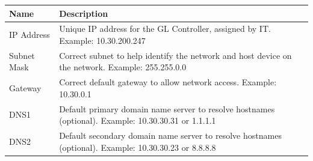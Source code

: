 \begin{longtable}[]{@{}ll@{}}
\toprule
\begin{minipage}[b]{0.26\columnwidth}\raggedright
Name\strut
\end{minipage} & \begin{minipage}[b]{0.68\columnwidth}\raggedright
Description\strut
\end{minipage}\tabularnewline
\midrule
\endhead
\begin{minipage}[t]{0.26\columnwidth}\raggedright
IP Address\strut
\end{minipage} & \begin{minipage}[t]{0.68\columnwidth}\raggedright
Unique IP address for the GL Controller, assigned by IT. Example:
10.30.200.247\strut
\end{minipage}\tabularnewline
\begin{minipage}[t]{0.26\columnwidth}\raggedright
Subnet Mask\strut
\end{minipage} & \begin{minipage}[t]{0.68\columnwidth}\raggedright
Correct subnet to help identify the network and host device on the
network. Example: 255.255.0.0\strut
\end{minipage}\tabularnewline
\begin{minipage}[t]{0.26\columnwidth}\raggedright
Gateway\strut
\end{minipage} & \begin{minipage}[t]{0.68\columnwidth}\raggedright
Correct default gateway to allow network access. Example:
10.30.0.1\strut
\end{minipage}\tabularnewline
\begin{minipage}[t]{0.26\columnwidth}\raggedright
DNS1\strut
\end{minipage} & \begin{minipage}[t]{0.68\columnwidth}\raggedright
Default primary domain name server to resolve hostnames (optional).
Example: 10.30.30.31 or 1.1.1.1\strut
\end{minipage}\tabularnewline
\begin{minipage}[t]{0.26\columnwidth}\raggedright
DNS2\strut
\end{minipage} & \begin{minipage}[t]{0.68\columnwidth}\raggedright
Default secondary domain name server to resolve hostnames (optional).
Example: 10.30.30.23 or 8.8.8.8\strut
\end{minipage}\tabularnewline
\bottomrule
\end{longtable}

